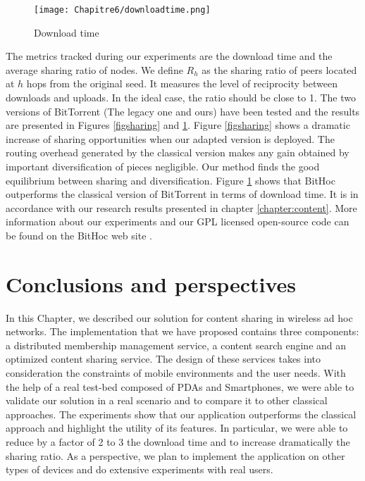 \begin{figure}[!htbp]
  \begin{center}
    \texttt{[image: Chapitre6/downloadtime.png]}
  \end{center}
  \caption{Download time}
  \label{FigDownloadtime}
\end{figure}
The metrics tracked during our experiments are the download time and the average sharing ratio of nodes. We define $R_{h}$ as the sharing ratio of peers located at $h$ hops from the original seed. It measures the level of reciprocity between downloads and uploads. In the ideal case, the ratio should be close to 1. The two versions of BitTorrent (The legacy one and ours) have been tested and the results are presented in Figures \ref{figsharing} and \ref{FigDownloadtime}. Figure \ref{figsharing} shows a dramatic increase of sharing opportunities when our adapted version is deployed. The routing overhead generated by the classical version makes any gain obtained by important diversification of pieces negligible. Our method finds the good equilibrium between sharing and diversification. Figure \ref{FigDownloadtime} shows that BitHoc outperforms the classical version of BitTorrent in terms of download time. It is in accordance with our research results presented in chapter \ref{chapter:content}. More information about our experiments and our GPL licensed open-source code can be found on the BitHoc web site \cite{Bithoc}.

\section{Conclusions and perspectives}
In this Chapter, we described our solution for content sharing in wireless ad hoc networks. The implementation that we have proposed contains three components: a distributed membership management service, a content search engine and an optimized content sharing service. The design of these services takes into consideration the constraints of mobile environments and the user needs. With the help of a real test-bed composed of PDAs and Smartphones, we were able to validate our solution in a real scenario and to compare it to other classical approaches. The experiments show that our application outperforms the classical approach and highlight the utility of its features. In particular, we were able to reduce by a factor of 2 to 3 the download time and to increase dramatically the sharing ratio. As a perspective, we plan to implement the application on other types of devices and do extensive experiments with real users.


